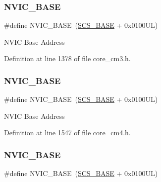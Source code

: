 \subsubsection{\texorpdfstring{N\+V\+I\+C\+\_\+\+B\+A\+SE}{NVIC\_BASE}\hspace{0.1cm}{\footnotesize\ttfamily [5/7]}}
{\footnotesize\ttfamily \#define N\+V\+I\+C\+\_\+\+B\+A\+SE~(\hyperlink{group___c_m_s_i_s__core__base_ga3c14ed93192c8d9143322bbf77ebf770}{S\+C\+S\+\_\+\+B\+A\+SE} +  0x0100\+U\+L)}

N\+V\+IC Base Address 

Definition at line 1378 of file core\+\_\+cm3.\+h.

\mbox{\label{group___c_m_s_i_s__core__base_gaa0288691785a5f868238e0468b39523d}} 
\subsubsection{\texorpdfstring{N\+V\+I\+C\+\_\+\+B\+A\+SE}{NVIC\_BASE}\hspace{0.1cm}{\footnotesize\ttfamily [6/7]}}
{\footnotesize\ttfamily \#define N\+V\+I\+C\+\_\+\+B\+A\+SE~(\hyperlink{group___c_m_s_i_s__core__base_ga3c14ed93192c8d9143322bbf77ebf770}{S\+C\+S\+\_\+\+B\+A\+SE} +  0x0100\+U\+L)}

N\+V\+IC Base Address 

Definition at line 1547 of file core\+\_\+cm4.\+h.

\mbox{\label{group___c_m_s_i_s__core__base_gaa0288691785a5f868238e0468b39523d}} 
\subsubsection{\texorpdfstring{N\+V\+I\+C\+\_\+\+B\+A\+SE}{NVIC\_BASE}\hspace{0.1cm}{\footnotesize\ttfamily [7/7]}}
{\footnotesize\ttfamily \#define N\+V\+I\+C\+\_\+\+B\+A\+SE~(\hyperlink{group___c_m_s_i_s__core__base_ga3c14ed93192c8d9143322bbf77ebf770}{S\+C\+S\+\_\+\+B\+A\+SE} +  0x0100\+U\+L)}

